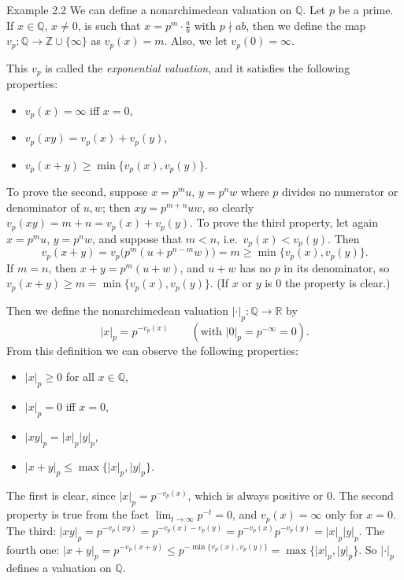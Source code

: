 \documentclass[11pt]{article}
\begin{document}
\begin{exbox}{Example 2.2}
We can define a nonarchimedean valuation on $\mathbb{Q}$. Let $p$ be a prime. If $x \in \mathbb{Q}$, $x \neq 0$, is such that $x = p^m \cdot \frac{a}{b}$ with $p \nmid ab$, then we define the map $v_p : \mathbb{Q} \rightarrow \mathbb{Z} \cup \{\infty\}$ as $v_p(x) = m$. Also, we let $v_p(0) = \infty$.

This $v_p$ is called the \textit{exponential valuation}, and it satisfies the following properties:
\begin{itemize}
\item $v_p(x) = \infty$ iff $x = 0$,
\item $v_p(xy) = v_p(x) + v_p(y)$,
\item $v_p(x + y) \geq \min\{v_p(x), v_p(y)\}$.
\end{itemize}
To prove the second, suppose $x = p^m u$, $y = p^n w$ where $p$ divides no numerator or denominator of $u, w$; then $xy = p^{m+n}uw$, so clearly $v_p(xy) = m + n = v_p(x) + v_p(y)$. To prove the third property, let again $x = p^m u$, $y = p^n w$, and suppose that $m < n$, i.e.\ $v_p(x) < v_p(y)$. Then
\[
v_p(x + y) = v_p\big(p^m(u + p^{n-m}w)\big) = m \geq \min\{v_p(x), v_p(y)\}.
\]
If $m = n$, then $x + y = p^m(u + w)$, and $u + w$ has no $p$ in its denominator, so $v_p(x + y) \geq m = \min\{v_p(x), v_p(y)\}$. (If $x$ or $y$ is $0$ the property is clear.)

Then we define the nonarchimedean valuation $|\cdot|_p : \mathbb{Q} \rightarrow \mathbb{R}$ by
\[
|x|_p = p^{-v_p(x)} \qquad (\text{with } |0|_p = p^{-\infty} = 0).
\]
From this definition we can observe the following properties:
\begin{itemize}
\item $|x|_p \geq 0$ for all $x \in \mathbb{Q}$,
\item $|x|_p = 0$ iff $x = 0$,
\item $|xy|_p = |x|_p |y|_p$,
\item $|x + y|_p \leq \max\{|x|_p, |y|_p\}$.
\end{itemize}
The first is clear, since $|x|_p = p^{-v_p(x)}$, which is always positive or $0$. The second property is true from the fact $\lim_{t \rightarrow \infty} p^{-t} = 0$, and $v_p(x) = \infty$ only for $x = 0$. The third: $|xy|_p = p^{-v_p(xy)} = p^{-v_p(x) - v_p(y)} = p^{-v_p(x)} p^{-v_p(y)} = |x|_p |y|_p$. The fourth one: $|x + y|_p = p^{-v_p(x + y)} \leq p^{-\min\{v_p(x), v_p(y)\}} = \max\{|x|_p, |y|_p\}$. So $|\cdot|_p$ defines a valuation on $\mathbb{Q}$.
\end{exbox}
\end{document}
